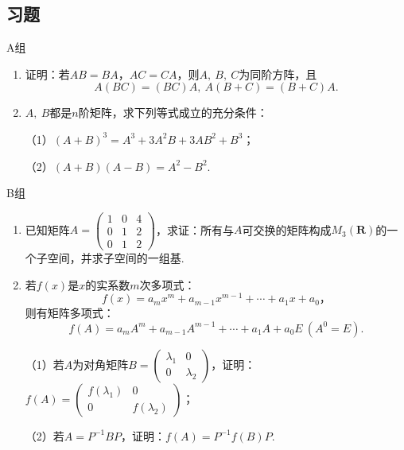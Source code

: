 \subsection{习题}
\centerline{\heiti A组}
\begin{enumerate}
	\item 证明：若$AB=BA$，$AC=CA$，则$A,\ B,\ C$为同阶方阵，且
	$$A(BC)=(BC)A,\ A(B+C)=(B+C)A.$$
	\item $A,\ B$都是$n$阶矩阵，求下列等式成立的充分条件：
	
	（1）$(A+B)^3=A^3+3A^2B+3AB^2+B^3$；

	（2）$(A+B)(A-B)=A^2-B^2$.
\end{enumerate}
\centerline{\heiti B组}
\begin{enumerate}
	\item 已知矩阵$A=\begin{pmatrix}
		1 & 0 & 4 \\ 0 & 1 & 2 \\ 0 & 1 & 2
	\end{pmatrix}$，求证：所有与$A$可交换的矩阵构成$M_3(\mathbf{R})$的一个子空间，并求子空间的一组基.
	\item 若$f(x)$是$x$的实系数$m$次多项式：
	$$f(x)=a_mx^m+a_{m-1}x^{m-1}+\cdots+a_1x+a_0，$$
	则有矩阵多项式：
	$$f(A)=a_mA^m+a_{m-1}A^{m-1}+\cdots+a_1A+a_0E\ (A^0=E).$$

	（1）若$A$为对角矩阵$B=\begin{pmatrix}
		\lambda_1 & 0 \\ 0 & \lambda_2
	\end{pmatrix}$，证明：$f(A)=\begin{pmatrix}
		f(\lambda_1) & 0 \\ 0 & f(\lambda_2)
	\end{pmatrix}$；

	（2）若$A=P^{-1}BP$，证明：$f(A)=P^{-1}f(B)P$.
\end{enumerate}

